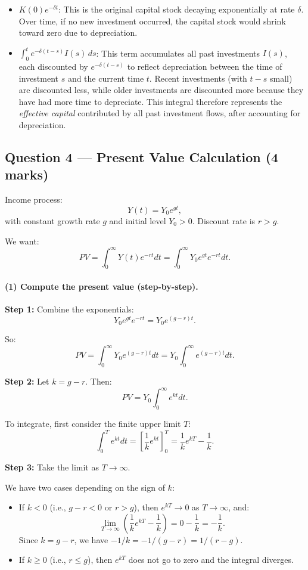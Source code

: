 \documentclass[12pt]{article}
\begin{document}
\begin{itemize}
\item $K(0)e^{-\delta t}$: This is the original capital stock decaying exponentially at rate $\delta$. Over time, if no new investment occurred, the capital stock would shrink toward zero due to depreciation.

\item $\displaystyle \int_0^t e^{-\delta (t-s)}I(s)\,ds$: This term accumulates all past investments $I(s)$, each discounted by $e^{-\delta (t-s)}$ to reflect depreciation between the time of investment $s$ and the current time $t$. Recent investments (with $t-s$ small) are discounted less, while older investments are discounted more because they have had more time to depreciate. This integral therefore represents the \emph{effective capital} contributed by all past investment flows, after accounting for depreciation.
\end{itemize}

\subsection*{Question 4 — Present Value Calculation (4 marks)}

Income process:
\[
Y(t) = Y_0 e^{gt},
\]
with constant growth rate $g$ and initial level $Y_0>0$. Discount rate is $r>g$.

We want:
\[
PV = \int_0^\infty Y(t)e^{-rt}dt = \int_0^\infty Y_0 e^{gt} e^{-rt} dt.
\]

\paragraph{(1) Compute the present value (step-by-step).}

\textbf{Step 1:} Combine the exponentials:
\[
Y_0 e^{gt}e^{-rt} = Y_0 e^{(g-r)t}.
\]

So:
\[
PV = \int_0^\infty Y_0 e^{(g-r)t} dt = Y_0 \int_0^\infty e^{(g-r)t} dt.
\]

\textbf{Step 2:} Let $k = g - r$. Then:
\[
PV = Y_0 \int_0^\infty e^{kt} dt.
\]

To integrate, first consider the finite upper limit $T$:
\[
\int_0^T e^{kt} dt = \left[\frac{1}{k} e^{kt}\right]_0^T 
= \frac{1}{k} e^{kT} - \frac{1}{k}.
\]

\textbf{Step 3:} Take the limit as $T \to \infty$.

We have two cases depending on the sign of $k$:
\begin{itemize}
\item If $k < 0$ (i.e., $g-r<0$ or $r>g$), then $e^{kT} \to 0$ as $T \to \infty$, and:
\[
\lim_{T\to\infty}\left(\frac{1}{k} e^{kT} - \frac{1}{k}\right)
= 0 - \frac{1}{k} = -\frac{1}{k}.
\]
Since $k = g-r$, we have $-1/k = -1/(g-r) = 1/(r-g)$.

\item If $k \ge 0$ (i.e., $r \le g$), then $e^{kT}$ does not go to zero and the integral diverges.
\end{itemize}
\end{document}
